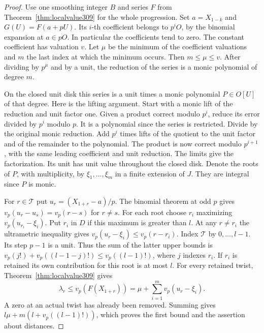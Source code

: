 \documentclass[a4paper,11pt]{article}
\theoremstyle{definition}
\theoremstyle{remark}
\numberwithin{equation}{section}
\begin{document}
\begin{proof}
Use one smoothing integer \(B\) and series \(F\) from
Theorem~\ref{thm:localvalue309} for the whole progression.
Set \(a=X_{1-k}\) and \(G(U)=F(a+pU)\). Its \(i\)-th coefficient
belongs to \(p^iO\), by the binomial expansion at \(a\in pO\).
In particular the coefficients tend to zero. The constant
coefficient has valuation \(v\). Let \(\mu\) be the minimum
of the coefficient valuations and \(m\) the last index at
which the minimum occurs. Then \(m\le\mu\le v\).
After dividing by \(p^\mu\) and by a unit, the reduction
of the series is a monic polynomial of degree \(m\).

On the closed unit disk this series is a unit times a monic
polynomial \(P\in O[U]\) of that degree. Here is the lifting
argument. Start with a monic lift of the reduction and unit
factor one. Given a product correct modulo \(p^i\), reduce its
error divided by \(p^i\) modulo \(p\). It is a polynomial
since the series is restricted. Divide by the original monic
reduction. Add \(p^i\) times lifts of the quotient to the unit
factor and of the remainder to the polynomial. The product is
now correct modulo \(p^{i+1}\), with the same leading coefficient
and unit reduction. The limits give the factorization. Its
unit has unit value throughout the closed disk. Denote the
roots of \(P\), with multiplicity, by \(\xi_1,\ldots,\xi_m\)
in a finite extension of \(J\). They are integral since \(P\)
is monic.

For \(r\in\mathcal T\) put \(u_r=(X_{1+r}-a)/p\).
The binomial theorem at odd \(p\) gives
\(v_p(u_r-u_s)=v_p(r-s)\) for \(r\ne s\).
For each root choose \(r_i\) maximizing \(v_p(u_{r_i}-\xi_i)\).
Put \(r_i\) in \(D\) if this maximum is greater than \(l\).
At any \(r\ne r_i\) the ultrametric inequality gives
\(v_p(u_r-\xi_i)\le v_p(r-r_i)\).
Index \(\mathcal T\) by \(0,\ldots,l-1\). Its step \(p-1\) is a
unit. Thus the sum of the latter upper bounds is
\(v_p(j!)+v_p((l-1-j)!)\le v_p((l-1)!)\), where \(j\) indexes
\(r_i\). If \(r_i\) is retained its own contribution for this
root is at most \(l\). For every retained twist,
Theorem~\ref{thm:localvalue309} gives
\[
    \lambda_r\le v_p(F(X_{1+r}))
        =\mu+\sum_{i=1}^m v_p(u_r-\xi_i).
\]
A zero at an actual twist has already been removed. Summing
gives \(l\mu+m(l+v_p((l-1)!))\), which proves the first bound
and the assertion about distances.


\end{proof}
\end{document}
